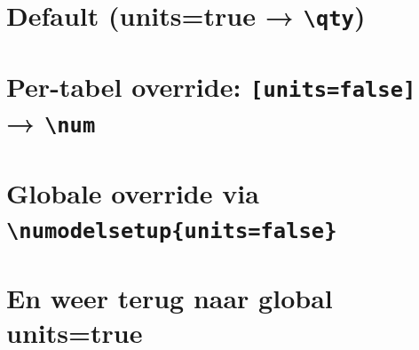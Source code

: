 \documentclass{article}
\begin{document}



\section*{Default (units=true → \texttt{\textbackslash qty})}
\textmodel

\section*{Per-tabel override: \texttt{[units=false]} → \texttt{\textbackslash num}}
\textmodel[units=false]

\section*{Globale override via \texttt{\textbackslash numodelsetup\{units=false\}}}
\textmodel

\section*{En weer terug naar global units=true}
\textmodel
\end{document}
